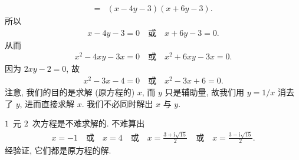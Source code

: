 \begin{example}
\begin{align*}
        = {} & (x - 4y - 3) (x + 6y - 3).
    \end{align*}
    所以
    \begin{align*}
        x - 4y - 3 = 0
        \quad \text{或} \quad
        x + 6y - 3 = 0.
    \end{align*}
    从而
    \begin{align*}
        x^2 - 4xy - 3x = 0
        \quad \text{或} \quad
        x^2 + 6xy - 3x = 0.
    \end{align*}
    因为 \(2xy - 2 = 0\),
    故
    \begin{align*}
        x^2 - 3x - 4 = 0
        \quad \text{或} \quad
        x^2 - 3x + 6 = 0.
    \end{align*}
    注意,
    我们的目的是求解 (原方程的) \(x\),
    而 \(y\) 只是辅助量,
    故我们用 \(y = 1/x\) 消去了 \(y\),
    进而直接求解 \(x\).
    我们不必同时解出 \(x\) 与 \(y\).

    \(1\)~元 \(2\)~次方程是不难求解的.
    不难算出
    \begin{align*}
        x = -1
        \quad \text{或} \quad
        x = 4
        \quad \text{或} \quad
        x = \frac{3 + \mathrm{i}\sqrt{15}}{2}
        \quad \text{或} \quad
        x = \frac{3 - \mathrm{i}\sqrt{15}}{2}.
    \end{align*}
    经验证, 它们都是原方程的解.
\end{example}
